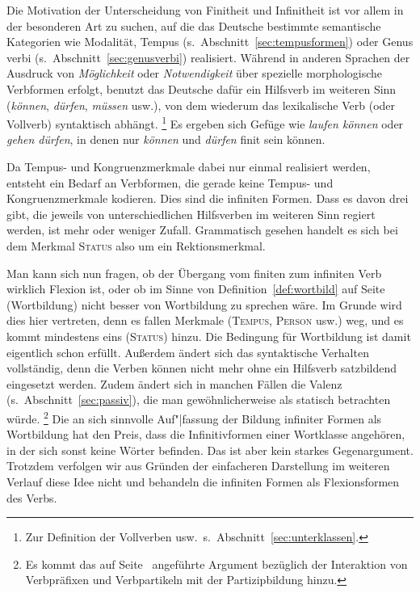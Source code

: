 \begin{exe}
\end{exe}

Die Motivation der Unterscheidung von Finitheit und Infinitheit ist vor allem in der besonderen Art zu suchen, auf die das Deutsche bestimmte semantische Kategorien wie Modalität, Tempus (s.\ Abschnitt~\ref{sec:tempusformen}) oder Genus verbi (s.\ Abschnitt~\ref{sec:genusverbi}) realisiert.
Während in anderen Sprachen \zB der Ausdruck von \textit{Möglichkeit} oder \textit{Notwendigkeit} über spezielle morphologische Verbformen erfolgt, benutzt das Deutsche dafür ein Hilfsverb im weiteren Sinn (\textit{können}, \textit{dürfen}, \textit{müssen} usw.), von dem wiederum das lexikalische Verb (oder Vollverb) syntaktisch abhängt.%
\footnote{Zur Definition der Vollverben usw.\ s.\ Abschnitt~\ref{sec:unterklassen}.}
Es ergeben sich Gefüge wie \textit{laufen können} oder \textit{gehen dürfen}, in denen nur \textit{können} und \textit{dürfen} finit sein können.

Da Tempus- und Kongruenzmerkmale dabei nur einmal realisiert werden, entsteht ein Bedarf an Verbformen, die gerade keine Tempus- und Kongruenzmerkmale kodieren.
Dies sind die infiniten Formen.
Dass es davon drei gibt, die jeweils von unterschiedlichen Hilfsverben im weiteren Sinn regiert werden, ist mehr oder weniger Zufall.
Grammatisch gesehen handelt es sich bei dem Merkmal \textsc{Status} also um ein Rektionsmerkmal.

\label{abs:finitheitundinfinitheit063}Man kann sich nun fragen, ob der Übergang vom finiten zum infiniten Verb wirklich Flexion ist, oder ob im Sinne von Definition~\ref{def:wortbild} auf Seite~\pageref{def:wortbild} (Wortbildung) nicht besser von Wortbildung zu sprechen wäre.
Im Grunde wird dies hier vertreten, denn es fallen Merkmale (\textsc{Tempus}, \textsc{Person} usw.) weg, und es kommt mindestens eins (\textsc{Status}) hinzu.
Die Bedingung für Wortbildung ist damit eigentlich schon erfüllt.
Außerdem ändert sich das syntaktische Verhalten vollständig, denn die Verben können nicht mehr ohne ein Hilfsverb satzbildend eingesetzt werden.
Zudem ändert sich in manchen Fällen die Valenz (s.\ Abschnitt~\ref{sec:passiv}), die man gewöhnlicherweise als statisch betrachten würde.%
\footnote{Es kommt das auf Seite~\pageref{abs:derivationohnewortklassenwechsel033} angeführte Argument bezüglich der Interaktion von Verbpräfixen und Verbpartikeln mit der Partizipbildung hinzu.}
Die an sich sinnvolle Auf"|fassung der Bildung infiniter Formen als Wortbildung hat den Preis, dass die Infinitivformen einer Wortklasse angehören, in der sich sonst keine Wörter befinden.
Das ist aber kein starkes Gegenargument.
Trotzdem verfolgen wir aus Gründen der einfacheren Darstellung im weiteren Verlauf diese Idee nicht und behandeln die infiniten Formen als Flexionsformen des Verbs.

